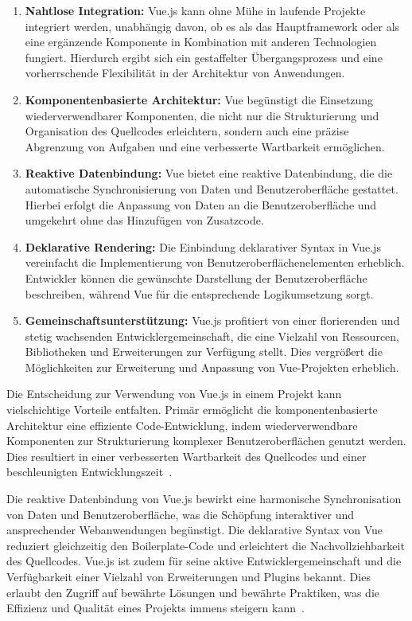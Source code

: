 \begin{enumerate}[itemsep=8pt, parsep=5pt]
    \item \textbf{Nahtlose Integration:} Vue.js kann ohne Mühe in laufende Projekte integriert werden, unabhängig davon,
ob es als das Hauptframework oder als eine ergänzende Komponente in Kombination mit anderen Technologien fungiert.
Hierdurch ergibt sich ein gestaffelter Übergangsprozess und eine vorherrschende Flexibilität in der Architektur von
Anwendungen.
    \item \textbf{Komponentenbasierte Architektur:} Vue begünstigt die Einsetzung wiederverwendbarer Komponenten, die
nicht nur die Strukturierung und Organisation des Quellcodes erleichtern, sondern auch eine präzise Abgrenzung von
Aufgaben und eine verbesserte Wartbarkeit ermöglichen.
    \item \textbf{Reaktive Datenbindung:} Vue bietet eine reaktive Datenbindung, die die automatische Synchronisierung
von Daten und Benutzeroberfläche gestattet. Hierbei erfolgt die Anpassung von Daten an die Benutzeroberfläche und
umgekehrt ohne das Hinzufügen von Zusatzcode.
    \item \textbf{Deklarative Rendering:} Die Einbindung deklarativer Syntax in Vue.js vereinfacht die Implementierung
von Benutzeroberflächenelementen erheblich. Entwickler können die gewünschte Darstellung der Benutzeroberfläche
beschreiben, während Vue für die entsprechende Logikumsetzung sorgt.
    \item \textbf{Gemeinschaftsunterstützung:} Vue.js profitiert von einer florierenden und stetig wachsenden
Entwicklergemeinschaft, die eine Vielzahl von Ressourcen, Bibliotheken und Erweiterungen zur Verfügung stellt. Dies
vergrößert die Möglichkeiten zur Erweiterung und Anpassung von Vue-Projekten erheblich.
\end{enumerate}

Die Entscheidung zur Verwendung von Vue.js in einem Projekt kann vielschichtige Vorteile entfalten. Primär ermöglicht
die komponentenbasierte Architektur eine effiziente Code-Entwicklung, indem wiederverwendbare Komponenten zur
Strukturierung komplexer Benutzeroberflächen genutzt werden. Dies resultiert in einer verbesserten Wartbarkeit des
Quellcodes und einer beschleunigten Entwicklungszeit~\cite{wohlgethan2018supportingweb}.

Die reaktive Datenbindung von Vue.js bewirkt eine harmonische Synchronisation von Daten und Benutzeroberfläche, was die
Schöpfung interaktiver und ansprechender Webanwendungen begünstigt. Die deklarative Syntax von Vue reduziert
gleichzeitig den Boilerplate-Code und erleichtert die Nachvollziehbarkeit des Quellcodes. Vue.js ist zudem für seine
aktive Entwicklergemeinschaft und die Verfügbarkeit einer Vielzahl von Erweiterungen und
Plugins bekannt. Dies erlaubt den Zugriff auf bewährte Lösungen und bewährte Praktiken, was die Effizienz und Qualität
eines Projekts immens steigern kann~\cite{wohlgethan2018supportingweb}.

